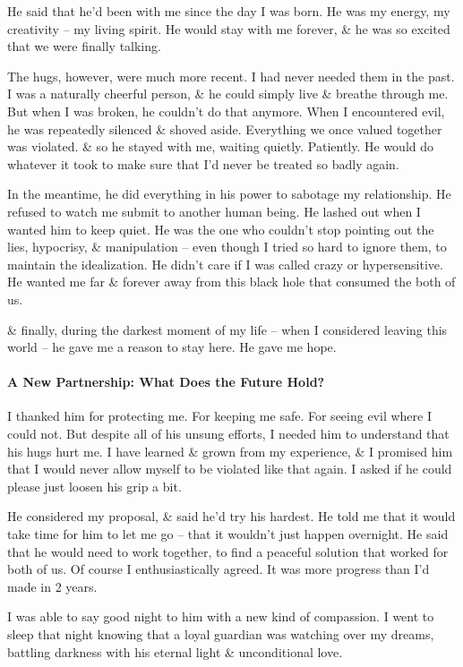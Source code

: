 \documentclass{article}
\numberwithin{equation}{section}
\begin{document}
He said that he'd been with me since the day I was born. He was my energy, my creativity -- my living spirit. He would stay with me forever, \& he was so excited that we were finally talking.

The hugs, however, were much more recent. I had never needed them in the past. I was a naturally cheerful person, \& he could simply live \& breathe through me. But when I was broken, he couldn't do that anymore. When I encountered evil, he was repeatedly silenced \& shoved aside. Everything we once valued together was violated. \& so he stayed with me, waiting quietly. Patiently. He would do whatever it took to make sure that I'd never be treated so badly again.

In the meantime, he did everything in his power to sabotage my relationship. He refused to watch me submit to another human being. He lashed out when I wanted him to keep quiet. He was the one who couldn't stop pointing out the lies, hypocrisy, \& manipulation -- even though I tried so hard to ignore them, to maintain the idealization. He didn't care if I was called crazy or hypersensitive. He wanted me far \& forever away from this black hole that consumed the both of us.

\& finally, during the darkest moment of my life -- when I considered leaving this world -- he gave me a reason to stay here. He gave me hope.

\paragraph{A New Partnership: What Does the Future Hold?} I thanked him for protecting me. For keeping me safe. For seeing evil where I could not. But despite all of his unsung efforts, I needed him to understand that his hugs hurt me. I have learned \& grown from my experience, \& I promised him that I would never allow myself to be violated like that again. I asked if he could please just loosen his grip a bit.

He considered my proposal, \& said he'd try his hardest. He told me that it would take time for him to let me go -- that it wouldn't just happen overnight. He said that he would need to work together, to find a peaceful solution that worked for both of us. Of course I enthusiastically agreed. It was more progress than I'd made in 2 years.

I was able to say good night to him with a new kind of compassion. I went to sleep that night knowing that a loyal guardian was watching over my dreams, battling darkness with his eternal light \& unconditional love.
\end{document}
